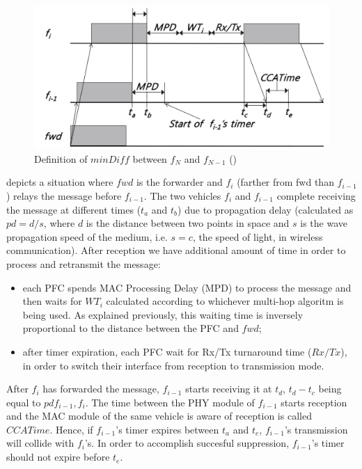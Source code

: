 			\begin{figure}[H]
				\centering
				\includegraphics[width=\textwidth]{immagini/minDiff}
				\caption{Definition of $minDiff$ between $f_N$ and $f_{N-1}$ (\cite{6906275})}
				\label{fig:minDiff}
			\end{figure}
		
			 depicts a situation where $fwd$ is the forwarder and $f_i$ (farther from fwd than $f_{i-1}$) relays the message before $f_{i-1}$. The two vehicles $f_i$ and $f_{i-1}$ complete receiving the message at different times ($t_a$ and $t_b$) due to propagation delay (calculated as $pd = d / s$, where $d$ is the distance between two points in space and $s$ is the wave propagation speed of the medium, i.e. $s=c$, the speed of light, in wireless communication). After reception we have additional amount of time in order to process and retransmit the message:
			\begin{itemize}
				\item each PFC spends MAC Processing Delay (MPD) to process the message and then waits for $WT_i$ calculated according to whichever multi-hop algoritm is being used. As explained previously, this waiting time is inversely proportional to the distance between the PFC and $fwd$;
				\item after timer expiration, each PFC wait for Rx/Tx turnaround time ($Rx/Tx$), in order to switch their interface from reception to transmission mode.
			\end{itemize}
			After $f_i$ has forwarded the message, $f_{i-1}$ starts receiving it at $t_d$, $t_d-t_c$  being equal to $pd{f_{i-1}, f_i}$. The time between the PHY module of $f_{i-1}$ starts reception and the MAC module of the same vehicle is aware of reception is called $CCATime$. Hence, if $f_{i-1}$'s timer expires between $t_a$ and $t_e$, $f_{i-1}$'s transmission will collide with $f_i$'s. In order to accomplish succesful suppression, $f_{i-1}$'s timer should not expire  before $t_e$. 
			
